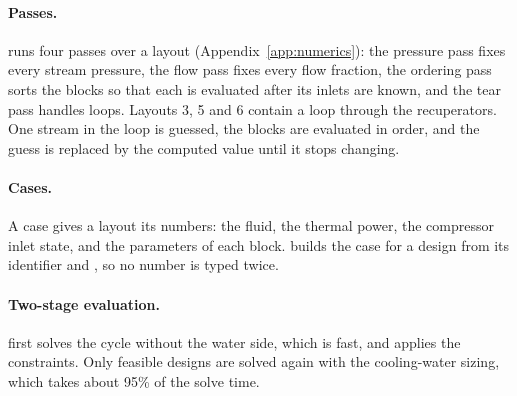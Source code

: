 \paragraph{Passes.}  runs four passes over a layout (Appendix~\ref{app:numerics}): the pressure pass fixes every stream pressure, the flow pass fixes every flow fraction, the ordering pass sorts the blocks so that each is evaluated after its inlets are known, and the tear pass handles loops. Layouts 3, 5 and 6 contain a loop through the recuperators. One stream in the loop is guessed, the blocks are evaluated in order, and the guess is replaced by the computed value until it stops changing.

\paragraph{Cases.} A case gives a layout its numbers: the fluid, the thermal power, the compressor inlet state, and the parameters of each block.  builds the case for a design from its identifier and , so no number is typed twice.

\paragraph{Two-stage evaluation.}  first solves the cycle without the water side, which is fast, and applies the constraints. Only feasible designs are solved again with the cooling-water sizing, which takes about 95\% of the solve time.

